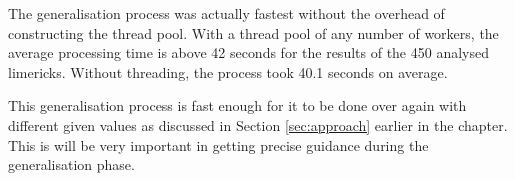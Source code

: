 The generalisation process was actually fastest without the overhead of constructing the thread pool. With a thread pool of any number of workers, the average processing time is above 42 seconds for the results of the 450 analysed limericks. Without threading, the process took 40.1 seconds on average.

This generalisation process is fast enough for it to be done over again with different given values as discussed in Section \ref{sec:approach} earlier in the chapter. This is will be very important in getting precise guidance during the generalisation phase.



